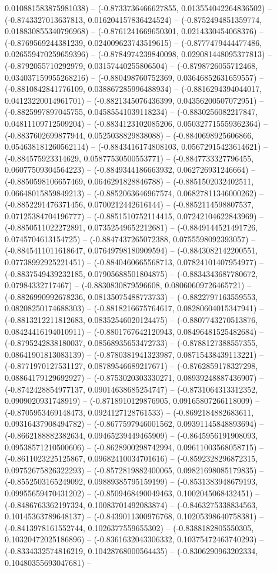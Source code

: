 0.010881583875981038) -- (-0.8733736466627855, 0.013554042264836502) -- (-0.8743327013637813, 0.016204157836424524) -- (-0.8752494851359774, 0.018830855340796968) -- (-0.8761241669650301, 0.0214330454068376) -- (-0.8769569244381239, 0.024009623743519615) -- (-0.8777479444477486, 0.026559470259659396) -- (-0.8784974239840098, 0.029081448095377813) -- (-0.8792055710292979, 0.03157440255806504) -- (-0.8798726055712468, 0.034037159955268216) -- (-0.880498760752369, 0.03646852631659557) -- (-0.8810842841776109, 0.038867285996488934) -- (-0.8816294394044017, 0.04123220014961701) -- (-0.8821345076436399, 0.04356200507072951) -- (-0.8825997897045755, 0.04585541039118234) -- (-0.8830256082217847, 0.04811109712509204) -- (-0.8834123102085206, 0.050327715559362364) -- (-0.8837602699877944, 0.0525038829838088) -- (-0.8840698925606866, 0.054638181260562114) -- (-0.8843416174808103, 0.05672915423614621) -- (-0.884575923314629, 0.05877530500553771) -- (-0.8847733327796455, 0.06077509304564223) -- (-0.8849344186663932, 0.062726931246664) -- (-0.8850598106657469, 0.0646291828846788) -- (-0.8851502032402511, 0.06648015859849213) -- (-0.8852063646967574, 0.06827811346000262) -- (-0.8852291476371456, 0.0700212442616144) -- (-0.8852114598807537, 0.07125384704196777) -- (-0.8851510752114415, 0.07242104622843969) -- (-0.8850511022272891, 0.07352549652212681) -- (-0.8849144521491726, 0.0745704613154725) -- (-0.8847437265072388, 0.0755598092393057) -- (-0.8845411011618647, 0.07649798180909594) -- (-0.8843082142200551, 0.07738992925221451) -- (-0.8840460665568713, 0.07824101407954977) -- (-0.8837549439232185, 0.07905688501804875) -- (-0.8834343687780672, 0.07984332717467) -- (-0.8830830879596608, 0.08060609726465721) -- (-0.8826990992678236, 0.08135075488773733) -- (-0.8822797163559553, 0.08208250174688303) -- (-0.8818216675764617, 0.08280604015347941) -- (-0.8813212211812683, 0.08352546020124475) -- (-0.8807743270513876, 0.08424416194010911) -- (-0.8801767642120943, 0.08496481525482684) -- (-0.8795242838180037, 0.08568935653472733) -- (-0.8788127388557355, 0.08641901813083139) -- (-0.8780381941323987, 0.08715438439113221) -- (-0.8771970127531127, 0.08789546689217671) -- (-0.8762859178327298, 0.08864179129692927) -- (-0.8753020303330271, 0.08939248887436907) -- (-0.8742428854977137, 0.09014638685254747) -- (-0.8731064313312352, 0.0909020931748919) -- (-0.8718910129876905, 0.09165807266118009) -- (-0.8705953469148473, 0.0924127128761533) -- (-0.8692184882683611, 0.09316437908494782) -- (-0.8677597946001562, 0.09391145848893694) -- (-0.8662188882382634, 0.09465239449465909) -- (-0.8645956191908093, 0.09538571210500606) -- (-0.8628900298742994, 0.09611003568058715) -- (-0.8611023225125867, 0.09682410034701616) -- (-0.8592328296872315, 0.09752675826322293) -- (-0.8572819882400065, 0.09821698085179835) -- (-0.8552503165249092, 0.09889385795159199) -- (-0.8531383948679193, 0.09955659470431202) -- (-0.8509468490049463, 0.1002045068432451) -- (-0.8486763362197324, 0.10083701492083874) -- (-0.8463275338834563, 0.10145363789648137) -- (-0.8439011300976768, 0.10205398640758381) -- (-0.8413978161552744, 0.1026377559655302) -- (-0.8388182805550305, 0.10320472025186896) -- (-0.8361632043306332, 0.10375472463740293) -- (-0.8334332574816219, 0.10428768000564435) -- (-0.8306290963202334, 0.10480355693047681) -- 